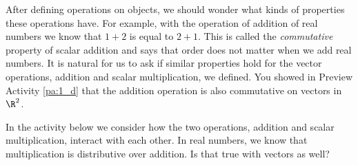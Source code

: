 After defining operations on objects, we should wonder what kinds of properties these operations have. For example, with the operation of addition of real numbers we know that $1+2$ is equal to $2+1$. This is called the \emph{commutative} property of scalar addition and says that order does not matter when we add real numbers. It is natural for us to ask if similar properties hold for the vector operations, addition and scalar multiplication, we defined. You showed in Preview Activity \ref{pa:1_d} that the addition operation is also commutative on vectors in $\R^2$. 



In the activity below we consider how the two operations, addition and scalar multiplication, interact with each other. In real numbers, we know that multiplication is distributive over addition. Is that true with vectors as well?



